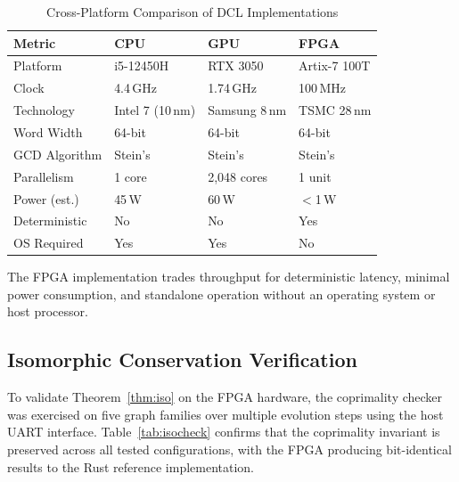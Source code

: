 \documentclass[lettersize,journal]{IEEEtran}
\begin{document}
\begin{table}[!t]
\caption{Cross-Platform Comparison of DCL Implementations\label{tab:compare}}
\centering
\begin{tabular}{@{}llll@{}}
\toprule
\textbf{Metric} & \textbf{CPU} & \textbf{GPU} & \textbf{FPGA} \\
\midrule
Platform       & i5-12450H       & RTX 3050       & Artix-7 100T \\
Clock          & 4.4\,GHz        & 1.74\,GHz      & 100\,MHz \\
Technology     & Intel 7 (10\,nm)& Samsung 8\,nm  & TSMC 28\,nm \\
Word Width     & 64-bit          & 64-bit         & 64-bit \\
GCD Algorithm  & Stein's         & Stein's        & Stein's \\
Parallelism    & 1 core          & 2{,}048 cores  & 1 unit \\
Power (est.)   & 45\,W           & 60\,W          & $<$1\,W \\
Deterministic  & No              & No             & Yes \\
OS Required    & Yes             & Yes            & No \\
\bottomrule
\end{tabular}
\vspace{0.5em}
\footnotesize The FPGA implementation trades throughput for deterministic latency, minimal power consumption, and standalone operation without an operating system or host processor.
\end{table}

\subsection{Isomorphic Conservation Verification}

To validate Theorem~\ref{thm:iso} on the FPGA hardware, the coprimality checker was exercised on five graph families over multiple evolution steps using the host UART interface. Table~\ref{tab:isocheck} confirms that the coprimality invariant is preserved across all tested configurations, with the FPGA producing bit-identical results to the Rust reference implementation.
\end{document}
